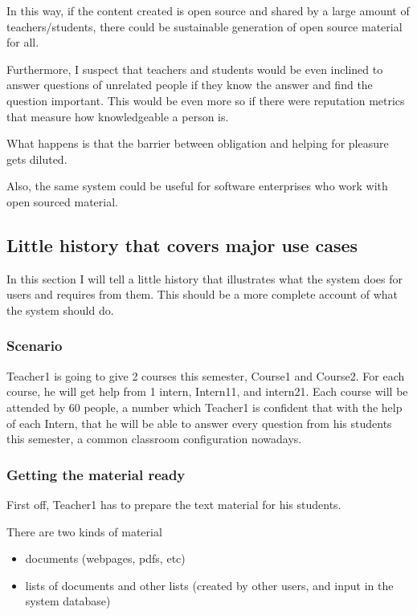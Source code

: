 \documentclass[12pt]{article}
\begin{document}
In this way, if the content created is open source and shared by a large amount of teachers/students, there could be sustainable generation of open source material for all.

Furthermore, I suspect that teachers and students would be even inclined to answer questions of unrelated people if they know the answer and find the question important. This would be even more so if there were reputation metrics that measure how knowledgeable a person is.

What happens is that the barrier between obligation and helping for pleasure gets diluted.

Also, the same system could be useful for software enterprises who work with open sourced material.

\subsection{Little history that covers major use cases} \label{use-cases-history}

In this section I will tell a little history that illustrates what the system does for users and requires from them. This should be a more complete account of what the system should do.

\subsubsection{Scenario} \label{use-cases-scenario}

Teacher1 is going to give 2 courses this semester, Course1 and Course2. For each course, he will get help from 1 intern, Intern11, and intern21. Each course will be attended by 60 people, a number which Teacher1 is confident that with the help of each Intern, that he will be able to answer every question from his students this semester, a common classroom configuration nowadays.

\subsubsection{Getting the material ready}

First off, Teacher1 has to prepare the text material for his students.

There are two kinds of material

\begin{itemize}
  \item documents (webpages, pdfs, etc)
  \item lists of documents and other lists (created by other users, and input in the system database)
\end{itemize}
\end{document}
